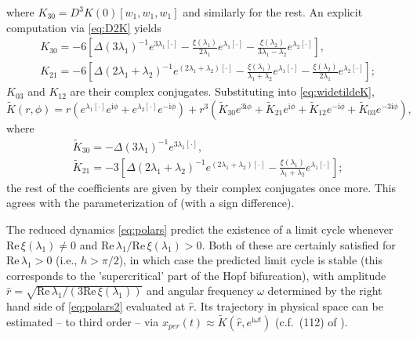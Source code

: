 \documentclass[a4paper, 12pt, oneside, reqno, notitlepage]{amsart}
\theoremstyle{plain}
\theoremstyle{definition}
\theoremstyle{remark}
\begin{document}
where $K_{30} = D^3K(0)[w_1,w_1,w_1]$ and similarly for the rest.
An explicit computation via \eqref{eq:D2K} yields
\begin{align*}
    &K_{30} = - 6 \left[ \Delta(3\lambda_1)^{-1} e^{3 \lambda_1[\cdot]} -\frac{\xi(\lambda_1)}{2\lambda_1}e^{\lambda_1[\cdot]} - \frac{\xi(\lambda_2)}{3 \lambda_1 - \lambda_2} e^{\lambda_2 [\cdot]} \right], \\
    &K_{21} =  - 6 \left[\Delta(2\lambda_1+\lambda_2)^{-1} e^{(2\lambda_1+\lambda_2)[\cdot]} -\frac{\xi(\lambda_1)}{\lambda_1+\lambda_2}e^{\lambda_1[\cdot]} - \frac{\xi(\lambda_2)}{2 \lambda_1} e^{\lambda_2 [\cdot]}  \right];
\end{align*}
$K_{03}$ and $K_{12}$ are their complex conjugates.
Substituting into \eqref{eq:widetildeK},
\begin{displaymath}
    \widetilde{K} (r, \phi) = r \left( e^{\lambda_1 [\cdot]}  e^{\mathrm{i} \phi} + e^{\lambda_2 [\cdot]} e^{-\mathrm{i} \phi} \right) + r^3 \left( \widetilde{K}_{30} e^{3\mathrm{i} \phi} + \widetilde{K}_{21} e^{\mathrm{i} \phi} + \widetilde{K}_{12} e^{-\mathrm{i} \phi} + \widetilde{K}_{03} e^{-3\mathrm{i} \phi} \right),
\end{displaymath}
where
\begin{align*}
    &\widetilde{K}_{30} = -\Delta(3\lambda_1)^{-1} e^{3 \lambda_1[\cdot]}, \\
    &\widetilde{K}_{21} = -3 \left[\Delta(2\lambda_1+\lambda_2)^{-1} e^{(2\lambda_1+\lambda_2)[\cdot]} -\frac{\xi(\lambda_1)}{\lambda_1+\lambda_2}e^{\lambda_1[\cdot]}  \right];
\end{align*}
the rest of the coefficients are given by their complex conjugates once more.
This agrees with the parameterization of \cite{szaksz2025spectral} (with a sign difference). 

The reduced dynamics \eqref{eq:polars} predict the existence of a limit cycle whenever $\mathrm{Re} \, \xi(\lambda_1) \neq 0$ and $\mathrm{Re} \, \lambda_1 / \mathrm{Re} \, \xi(\lambda_1) > 0$. 
Both of these are certainly satisfied for $\mathrm{Re} \, \lambda_1 > 0$ (i.e., $h>\pi/2$), in which case the predicted limit cycle is stable (this corresponds to the 'supercritical' part of the Hopf bifurcation), with 
amplitude $\hat{r} = \sqrt{\mathrm{Re} \, \lambda_1 /  (3\mathrm{Re} \, \xi(\lambda_1))}$ and angular frequency $\omega$ determined by the right hand side of \eqref{eq:polars2} evaluated at $\hat{r}$.
Its trajectory in physical space can be estimated -- to third order -- via $x_{per}(t) \approx\widetilde{K}(\hat{r},e^{\mathrm{i}\omega t})$ (c.f.\ (112) of \cite{szaksz2025spectral}).
\end{document}
